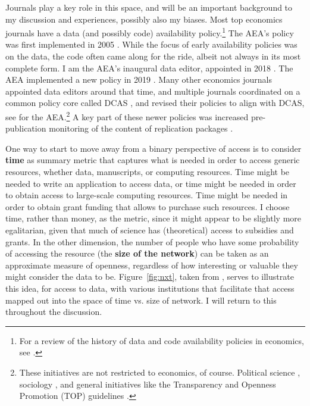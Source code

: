 \documentclass{article}
\begin{document}
Journals play a key role in this space, and will be an important background to my discussion and experiences, possibly also my biases. Most top economics journals have a data (and possibly code) availability policy.\footnote{For a review of the history of data and code availability policies in economics, see \citet{vlaeminck_dawning_2021}.} The AEA's policy was first implemented in 2005 \citep{bernanke_editorial_2004,american_economic_association_data_2005}. While the focus of early availability policies was on the data, the code often came along for the ride, albeit not always in its most complete form. I am the \ac{AEA}'s inaugural data editor, appointed in 2018 \citep{10.1257/pandp.108.745}. The AEA implemented a new policy in 2019 \citep{AEA-announcement-July-2019,AEA-announcement-July-2019}. Many other economics journals appointed data editors around that time, and  multiple journals coordinated on a common policy core called  \ac{DCAS} \citep{koren_data_2022}, and revised their policies to align with \ac{DCAS}, see \citet{american_economic_association_data_2024} for the AEA.\footnote{These initiatives are not restricted to economics, of course. Political science \citep{noauthor_data_2014,jacoby_american_2015,basile_research_2023}, sociology \citep{sociological_science_manuscript_2018,weeden_crisis_2023}, and general initiatives like the Transparency and Openness Promotion (TOP) guidelines \citep{nosek_promoting_2015}.} A key part of these newer policies was increased pre-publication monitoring of the content of replication packages \citep{10.1257/pandp.108.745,ChristianInt.J.Digit.Curation2018}.


One way to start to move away from a binary perspective of access is to consider \textbf{time} as summary metric that captures what is needed in order to access generic resources, whether data, manuscripts, or computing resources. Time might be needed to write an application to access data, or time might be needed in order to obtain access to large-scale computing resources. Time might be needed in order to obtain grant funding that allows to purchase such resources. I choose time, rather than money, as the metric, since it might appear to be slightly more egalitarian, given that much of science has (theoretical) access to subsidies and grants. In the other dimension,  the number of people who have some probability of accessing the resource (the \textbf{size of the network}) can be taken as an approximate measure of openness, regardless of how interesting or valuable they might consider the data to be. Figure~\ref{fig:nxt}, taken from \citet{vilhuber_reproducibility_2023}, serves to illustrate this idea, for access to data, with various institutions that facilitate that access mapped out into the space of time vs. size of network. I will return to this throughout the discussion.
\end{document}
